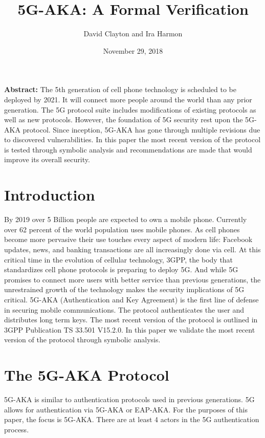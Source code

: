 \documentclass[11pt, pdftex]{article}
\title{5G-AKA: A Formal Verification}
\author{David Clayton and Ira Harmon}
\date{November 29, 2018}
\begin{document}
\maketitle
\textbf{Abstract:} 
The 5th generation of cell phone technology is scheduled to be deployed by 2021.  It will connect more people around the world than any prior generation.  The 5G protocol suite includes modifications of existing protocols as well as new protocols.  However, the foundation of 5G security rest upon the 5G-AKA protocol.  Since inception, 5G-AKA has gone through multiple revisions due to discovered vulnerabilities.  In this paper the most recent version of the protocol is tested through symbolic analysis and recommendations are made that would improve its overall security.

\newpage
\section{Introduction}
By 2019 over 5 Billion people are expected to own a mobile phone.  Currently over 62 percent of the world population uses mobile phones.  As cell phones become more pervasive their use touches every aspect of modern life: Facebook updates, news, and banking transactions are all increasingly done via cell.  At this critical time in the evolution of cellular technology, 3GPP, the body that standardizes cell phone protocols is preparing to deploy 5G.  And while 5G promises to connect more users with better service than previous generations, the unrestrained growth of the technology makes the security implications of 5G critical.  5G-AKA (Authentication and Key Agreement) is the first line of defense in securing mobile communications.  The protocol authenticates the user and distributes long term keys.  The most recent version of the protocol is outlined in 3GPP Publication TS 33.501 V15.2.0.  In this paper we validate the most recent version of the protocol through symbolic analysis.  

\section{The 5G-AKA Protocol}

5G-AKA is similar to authentication protocols used in previous generations.  5G allows for authentication via 5G-AKA or EAP-AKA.  For the purposes of this paper, the focus is 5G-AKA.  There are at least 4 actors in the 5G authentication process.  
\end{document}
